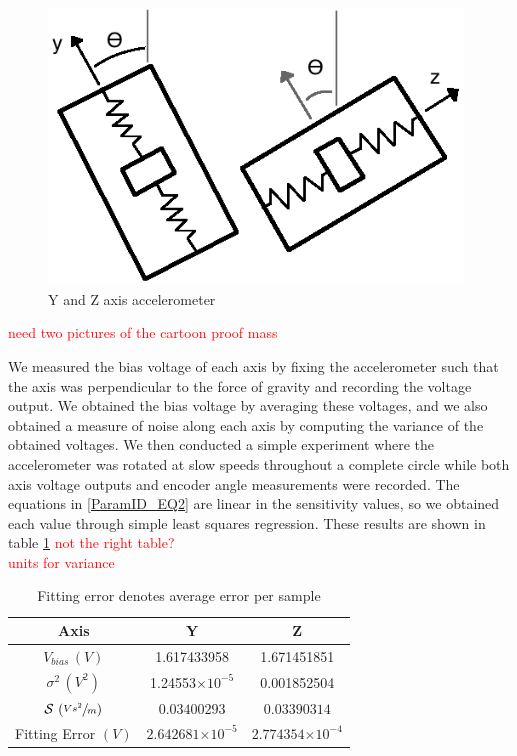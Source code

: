 \documentclass{article}
\newcommand{\xxx}[1]{\textcolor{red}{#1}}
\theoremstyle{plain}
\theoremstyle{definition}
\theoremstyle{remark}
\newcommand{\Sens}{\mathcal{S}}
\providecommand{\e}[1]{\ensuremath{\times 10^{#1}}}
\begin{document}
\begin{figure}
\begin{center}
\includegraphics[width = 11cm]{Accelerometer_Cartoon.png}
\caption{Y and Z axis accelerometer}
\label{Accel_cartoon}
\end{center}
\end{figure}

\xxx{need two pictures of the cartoon proof mass}

We measured the bias voltage of each axis by fixing the accelerometer such that the axis was perpendicular to the force of gravity and recording the voltage output.  We obtained the bias voltage by averaging these voltages, and we also obtained a measure of noise along each axis by computing the variance of the obtained voltages.  We then conducted a simple experiment where the accelerometer was rotated at slow speeds throughout a complete circle while both axis voltage outputs and encoder angle measurements were recorded.  The equations in \ref{ParamID_EQ2} are linear in the sensitivity values, so we obtained each value through simple least squares regression.  These results are shown in table \ref{ParamID_T} \xxx{not the right table?} \\

\xxx{units for variance}
\begin{table}
\begin{center}
    \begin{tabular}{|c|c|c|}
        \hline
        Axis                              & Y                     & Z                     \\ \hline
        $V_{bias} \, (V)$                        & 1.617433958           & 1.671451851           \\ 
        $\sigma^2 \, (V^2)$                        & 1.24553\e{-5}           & 0.001852504           \\ 
        $\Sens \, \left(\sfrac{V s^2}{m} \right)$                           & $0.03400293$     & $0.03390314$     \\ 
        Fitting Error $(V)$ & $2.642681\e{-5}$ & $2.774354\e{-4}$ \\
        \hline
    \end{tabular}
\label{ParamID_T}
\caption{Fitting error denotes average error per sample}
\end{center}
\end{table}
\end{document}
